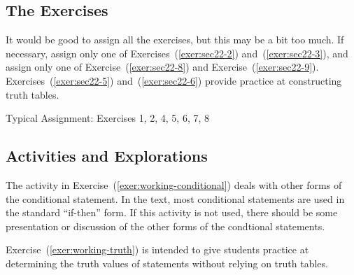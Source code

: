 \subsection*{The Exercises}

It would be good to assign all the exercises, but this may be a bit too much.  If necessary, assign only one of Exercises~(\ref{exer:sec22-2}) and~(\ref{exer:sec22-3}), and assign only one of Exercise~(\ref{exer:sec22-8}) and Exercise~(\ref{exer:sec22-9}).  
Exercises~(\ref{exer:sec22-5}) and~(\ref{exer:sec22-6}) provide practice at constructing truth tables.

\vskip6pt
\noindent
Typical Assignment:  Exercises 1, 2, 4, 5, 6, 7, 8
\hbreak

\subsection*{Activities and Explorations}

The activity in Exercise~(\ref{exer:working-conditional}) deals with other forms of the conditional statement.  In the text, most conditional statements are used in the standard ``if-then'' form.  If this activity is not used, there should be some presentation or discussion of the other forms of the condtional statements.

\newpar
Exercise~(\ref{exer:working-truth}) is intended to give students practice at determining the truth values of statements without relying on truth tables.
\hbreak

\endinput
